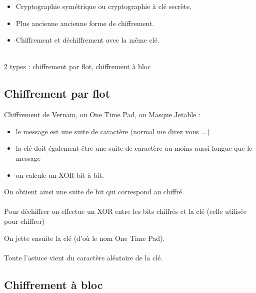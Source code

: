 \documentclass{beamer}
\begin{document}
    \begin{frame}
        \begin{itemize}
            \item Cryptographie symétrique ou cryptographie à clé secrète.
            \item Plus ancienne ancienne forme de chiffrement.
            \item Chiffrement et déchiffrement avec la même clé. \\~\\
        \end{itemize}

        \begin{center} 2 types : chiffrement par flot, chiffrement à bloc \end{center}
    \end{frame}

    \subsection{Chiffrement par flot}

    \begin{frame}
        Chiffrement de Vernam, ou One Time Pad, ou Masque Jetable :

        \begin{itemize}
            \item le message est une suite de caractère (normal me direz vous ...)
            \item la clé doit également être une suite de caractère au moins aussi longue que le message
            \item on calcule un XOR bit à bit.
        \end{itemize}

        On obtient ainsi une suite de bit qui correspond au chiffré. \\~\\

        Pour déchiffrer on effectue un XOR entre les bits chiffrés et la clé (celle utilisée pour chiffrer)

        On jette ensuite la clé (d'où le nom One Time Pad). \\~\\

        Toute l'astuce vient du caractère aléatoire de la clé.

    \end{frame}

    \subsection{Chiffrement à bloc}
\end{document}
